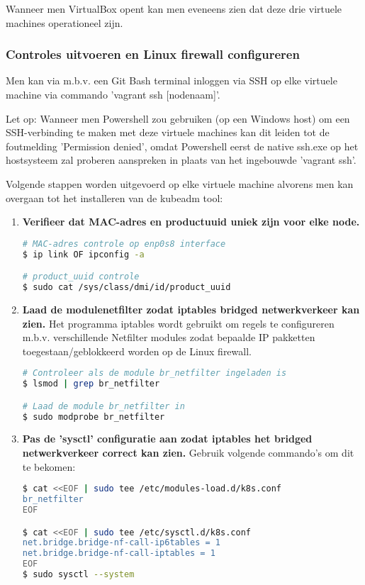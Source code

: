 Wanneer men VirtualBox opent kan men eveneens zien dat deze drie virtuele machines operationeel zijn. 


\subsubsection{Controles uitvoeren en Linux firewall configureren}

Men kan via m.b.v. een Git Bash terminal inloggen via SSH op elke virtuele machine via commando 'vagrant ssh [nodenaam]'.

Let op: Wanneer men Powershell zou gebruiken (op een Windows host) om een SSH-verbinding te maken met deze virtuele machines kan dit leiden tot de foutmelding 'Permission denied', omdat Powershell eerst de native ssh.exe op het hostsysteem zal proberen aanspreken in plaats van het ingebouwde 'vagrant ssh'.

Volgende stappen worden uitgevoerd op elke virtuele machine alvorens men kan overgaan tot het installeren van de kubeadm tool: 
\begin{enumerate}
    \item {\bf Verifieer dat MAC-adres en product\textunderscore uuid uniek zijn voor elke node.}
\begin{lstlisting}[language=bash]
# MAC-adres controle op enp0s8 interface
$ ip link OF ipconfig -a

# product_uuid controle 
$ sudo cat /sys/class/dmi/id/product_uuid     
\end{lstlisting} 

    \item {\bf Laad de module\textunderscore netfilter zodat iptables bridged netwerkverkeer kan zien.}
Het programma iptables wordt gebruikt om regels te configureren m.b.v. verschillende Netfilter modules zodat bepaalde IP pakketten toegestaan/geblokkeerd worden op de Linux firewall.
\begin{lstlisting}[language=bash]
# Controleer als de module br_netfilter ingeladen is 
$ lsmod | grep br_netfilter

# Laad de module br_netfilter in
$ sudo modprobe br_netfilter
\end{lstlisting}

    \item {\bf Pas de 'sysctl' configuratie aan zodat iptables het bridged netwerkverkeer correct kan zien.}
Gebruik volgende commando's om dit te bekomen:
\begin{lstlisting}[language=bash]
$ cat <<EOF | sudo tee /etc/modules-load.d/k8s.conf
br_netfilter
EOF

$ cat <<EOF | sudo tee /etc/sysctl.d/k8s.conf
net.bridge.bridge-nf-call-ip6tables = 1
net.bridge.bridge-nf-call-iptables = 1
EOF
$ sudo sysctl --system
\end{lstlisting}
    
\end{enumerate}


